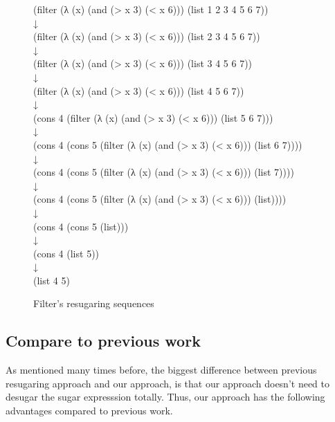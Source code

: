 \begin{figure}[ht]
	\centering
	\parbox[t]{\textwidth}{
	
				\begin{center}
				{
					\small\selectfont
					(filter (λ (x) (and (> x 3) (< x 6))) (list 1 2 3 4 5 6 7))\\
					↓\\
					(filter (λ (x) (and (> x 3) (< x 6))) (list 2 3 4 5 6 7))\\
					↓\\
					(filter (λ (x) (and (> x 3) (< x 6))) (list 3 4 5 6 7))\\
					↓\\
					(filter (λ (x) (and (> x 3) (< x 6))) (list 4 5 6 7))\\
					↓\\
					(cons 4 (filter (λ (x) (and (> x 3) (< x 6))) (list 5 6 7)))\\
					↓\\
					(cons 4 (cons 5 (filter (λ (x) (and (> x 3) (< x 6))) (list 6 7))))\\
					↓\\
					(cons 4 (cons 5 (filter (λ (x) (and (> x 3) (< x 6))) (list 7))))\\
					↓\\
					(cons 4 (cons 5 (filter (λ (x) (and (> x 3) (< x 6))) (list))))\\
					↓\\
					(cons 4 (cons 5 (list)))\\
					↓\\
					(cons 4 (list 5))\\
					↓\\
					(list 4 5)
				}
					
				\end{center}
				
			}
	\caption{Filter's resugaring sequences}
\label{fig:filter}
\end{figure}
\subsection{Compare to previous work}

As mentioned many times before, the biggest difference between previous resugaring approach and our approach, is that our approach doesn't need to desugar the sugar expresssion totally. Thus, our approach has the following advantages compared to previous work.

